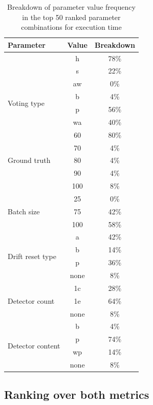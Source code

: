 \begin{table}[]
\centering
\caption{\label{table:rank_seconds_breakdown}Breakdown of parameter value frequency in the top 50 ranked parameter combinations for execution time}
\begin{tabular}{|l|c|c|}
\hline
\textbf{Parameter} & \textbf{Value} & \textbf{Breakdown} \\ \hline \hhline{===}
\multirow{2}{*}{Window type} & h & 78\% \\ \cline{2-3} 
 & s & 22\% \\ \hline
\multirow{4}{*}{Voting type} & aw & 0\% \\ \cline{2-3} 
 & b & 4\% \\ \cline{2-3} 
 & p & 56\% \\ \cline{2-3} 
 & wa & 40\% \\ \hline
\multirow{5}{*}{Ground truth} & 60 & 80\% \\ \cline{2-3} 
 & 70 & 4\% \\ \cline{2-3} 
 & 80 & 4\% \\ \cline{2-3} 
 & 90 & 4\% \\ \cline{2-3} 
 & 100 & 8\% \\ \hline
\multirow{3}{*}{Batch size} & 25 & 0\% \\ \cline{2-3} 
 & 75 & 42\% \\ \cline{2-3} 
 & 100 & 58\% \\ \hline
\multirow{4}{*}{Drift reset type} & a & 42\% \\ \cline{2-3} 
 & b & 14\% \\ \cline{2-3} 
 & p & 36\% \\ \cline{2-3} 
 & none & 8\% \\ \hline
\multirow{3}{*}{Detector count} & 1c & 28\% \\ \cline{2-3} 
 & 1e & 64\% \\ \cline{2-3} 
 & none & 8\% \\ \hline
\multicolumn{1}{|c|}{\multirow{4}{*}{Detector content}} & b & 4\% \\ \cline{2-3} 
\multicolumn{1}{|c|}{} & p & 74\% \\ \cline{2-3} 
\multicolumn{1}{|c|}{} & wp & 14\% \\ \cline{2-3} 
\multicolumn{1}{|c|}{} & none & 8\% \\ \hline
\end{tabular}
\end{table}

\subsection{Ranking over both metrics}

